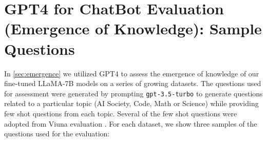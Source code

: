 \clearpage
\section{GPT4 for ChatBot Evaluation (Emergence of Knowledge): Sample Questions}


In \secLabel \ref{sec:emergence} we utilized GPT4 to assess the emergence of knowledge of our fine-tuned LLaMA-7B models on a series of growing datasets. The questions used for assessment were generated by prompting \texttt{gpt-3.5-turbo} to generate questions related to a particular topic (AI Society, Code, Math or Science) while providing few shot questions from each topic. Several of the few shot questions were adopted from Viuna  evaluation \cite{vicuna}. For each dataset, we show three samples of the questions used for the evaluation:

